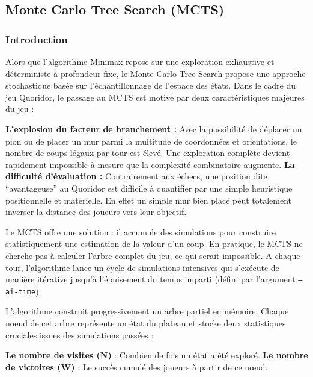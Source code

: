 \documentclass[a4paper]{article}
\begin{document}
\subsection{Monte Carlo Tree Search (MCTS)}

\subsubsection{Introduction}

Alors que l’algorithme Minimax repose sur une exploration exhaustive et déterministe à profondeur fixe, 
le Monte Carlo Tree Search propose une approche stochastique basée sur l'échantillonnage de l’espace des états. 
Dans le cadre du jeu Quoridor, le passage au MCTS est motivé par deux caractéristiques majeures du jeu : 

\bigskip

\textbf{L'explosion du facteur de branchement :} Avec la possibilité de déplacer un pion ou de placer un mur parmi la multitude de coordonnées et orientations, le nombre de coups légaux par tour est élevé. Une exploration complète devient rapidement impossible à mesure que la complexité combinatoire augmente.
\newline
\textbf{La difficulté d’évaluation :} Contrairement aux échecs, une position dite “avantageuse” au Quoridor est difficile à quantifier par une simple heuristique positionnelle et matérielle. En effet un simple mur bien placé peut totalement inverser la distance des joueurs vers leur objectif.

\bigskip

Le MCTS offre une solution : il accumule des simulations pour construire statistiquement une estimation de la valeur d’un coup. 
En pratique, le MCTS ne cherche pas à calculer l’arbre complet du jeu, ce qui serait impossible. A chaque tour, l’algorithme lance un cycle 
de simulations intensives qui s'exécute de manière itérative jusqu’à l’épuisement du temps imparti (défini par l’argument \texttt{--ai-time}).

L’algorithme construit progressivement un arbre partiel en mémoire. Chaque noeud de cet arbre représente un état du plateau et stocke 
deux statistiques cruciales issues des simulations passées : 

\bigskip


\textbf{Le nombre de visites (N)} : Combien de fois un état a été exploré.
\newline
\textbf{Le nombre de victoires (W)} : Le succès cumulé des joueurs à partir de ce nœud.
\end{document}
